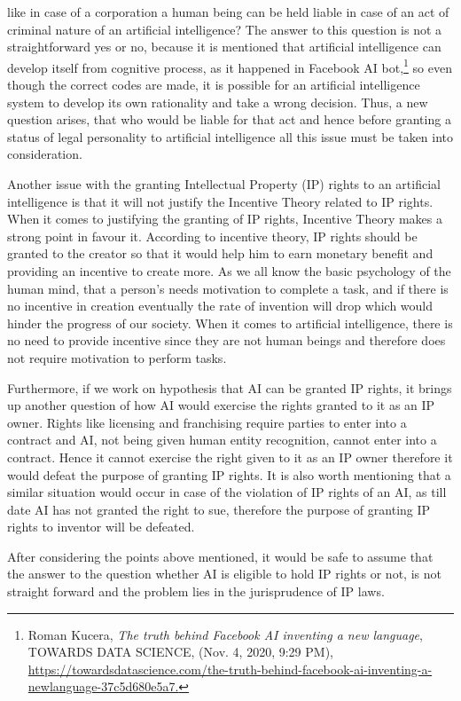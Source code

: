 \begin{multicols}{2}
like in case of a corporation a human being can be held liable in case of an act of criminal
nature of an artificial intelligence? The answer to this question is not a straightforward yes
or no, because it is mentioned that artificial intelligence can develop itself from cognitive
process, as it happened in Facebook AI bot,\footnote{Roman Kucera, \textit{The truth behind Facebook AI inventing a new language}, TOWARDS DATA SCIENCE,
(Nov. 4, 2020, 9:29 PM), \url{https://towardsdatascience.com/the-truth-behind-facebook-ai-inventing-a-newlanguage-37c5d680e5a7.} }
 so even though the correct codes are made, it is
possible for an artificial intelligence system to develop its own rationality and take a wrong
decision. Thus, a new question arises, that who would be liable for that act and hence before
granting a status of legal personality to artificial intelligence all this issue must be taken into
consideration. 

\noi
Another issue with the granting Intellectual Property (IP) rights to an artificial intelligence is
that it will not justify the Incentive Theory related to IP rights. When it comes to justifying
the granting of IP rights, Incentive Theory makes a strong point in favour it. According to
incentive theory, IP rights should be granted to the creator so that it would help him to earn
monetary benefit and providing an incentive to create more. As we all know the basic
psychology of the human mind, that a person’s needs motivation to complete a task, and if
there is no incentive in creation eventually the rate of invention will drop which would
hinder the progress of our society. When it comes to artificial intelligence, there is no need to provide incentive since they are not human beings and therefore does not require
motivation to perform tasks. 

\noi
Furthermore, if we work on hypothesis that AI can be granted IP rights, it brings up another
question of how AI would exercise the rights granted to it as an IP owner. Rights like
licensing and franchising require parties to enter into a contract and AI, not being given
human entity recognition, cannot enter into a contract. Hence it cannot exercise the right
given to it as an IP owner therefore it would defeat the purpose of granting IP rights. It is
also worth mentioning that a similar situation would occur in case of the violation of IP
rights of an AI, as till date AI has not granted the right to sue, therefore the purpose of
granting IP rights to inventor will be defeated. 

\noi
After considering the points above mentioned, it would be safe to assume that the answer to
the question whether AI is eligible to hold IP rights or not, is not straight forward and the
problem lies in the jurisprudence of IP laws. 


\end{multicols}
